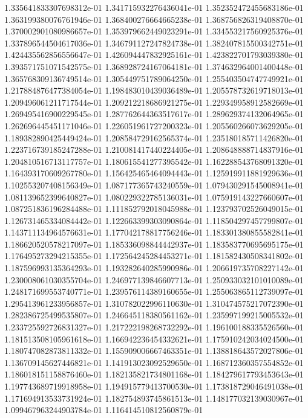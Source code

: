 1.335641833307698312e-01
1.341715932276436041e-01
1.352352472455683186e-01
1.363199380076761946e-01
1.368400276664665238e-01
1.368756826319408870e-01
1.370002901080986657e-01
1.353979662449023291e-01
1.334553217560925376e-01
1.337896544504617036e-01
1.346791127247824738e-01
1.382407815500342751e-01
1.424435562856556647e-01
1.426094447832925161e-01
1.423822701793039380e-01
1.393571751071542575e-01
1.368928724167064181e-01
1.374632964001400448e-01
1.365768309136749514e-01
1.305449751789064250e-01
1.255403504747749921e-01
1.217884876477384054e-01
1.198483010439036489e-01
1.205578732619718013e-01
1.209496061211717544e-01
1.209212218686921275e-01
1.229349958912582669e-01
1.269495416900229545e-01
1.287762644363517617e-01
1.289629374132064965e-01
1.262696445451171046e-01
1.226051961727200323e-01
1.205560266073629205e-01
1.189382890425449424e-01
1.208584729162565374e-01
1.235180185711426820e-01
1.223716739185247288e-01
1.210081417440224405e-01
1.208648888714837916e-01
1.204810516713117757e-01
1.180615541277395542e-01
1.162288543768091320e-01
1.164393170609267780e-01
1.156425465464094443e-01
1.125919911881929636e-01
1.102553207408156349e-01
1.087177365743240559e-01
1.079430291545008941e-01
1.081139652399640827e-01
1.080229322785136031e-01
1.075919143227660607e-01
1.087251836196284488e-01
1.111852792018045988e-01
1.123793702526049015e-01
1.126731465334084442e-01
1.122663399303090864e-01
1.118504297457799807e-01
1.143711134964576631e-01
1.177042178817756246e-01
1.183301380855582841e-01
1.186620520578217097e-01
1.185336098844442937e-01
1.183583770695695175e-01
1.176495273294215355e-01
1.172564245284453271e-01
1.181582430508341802e-01
1.187596993135364293e-01
1.193282640285990986e-01
1.206619735708227142e-01
1.230008061030355704e-01
1.246977139846607713e-01
1.250933032101010089e-01
1.248171699553740771e-01
1.239576114389160655e-01
1.255063865112739097e-01
1.295413961233956857e-01
1.310782022996110630e-01
1.310474575217072390e-01
1.282386725499535807e-01
1.246645118380561162e-01
1.235997199215005532e-01
1.233725592726831327e-01
1.217222198268732292e-01
1.196100188335526560e-01
1.181513508105961618e-01
1.166942236454332621e-01
1.175910242034024500e-01
1.180747082873811332e-01
1.155909006667463351e-01
1.138818643572027806e-01
1.136709145627446821e-01
1.141913023092529650e-01
1.168712360357554852e-01
1.186018151158876460e-01
1.182135821734801168e-01
1.184279617793453643e-01
1.197743689719918958e-01
1.194915779413700530e-01
1.173818729046491038e-01
1.171694913533731924e-01
1.182754893745861513e-01
1.148177032139030967e-01
1.099467963244903784e-01
1.116414510812560879e-01
